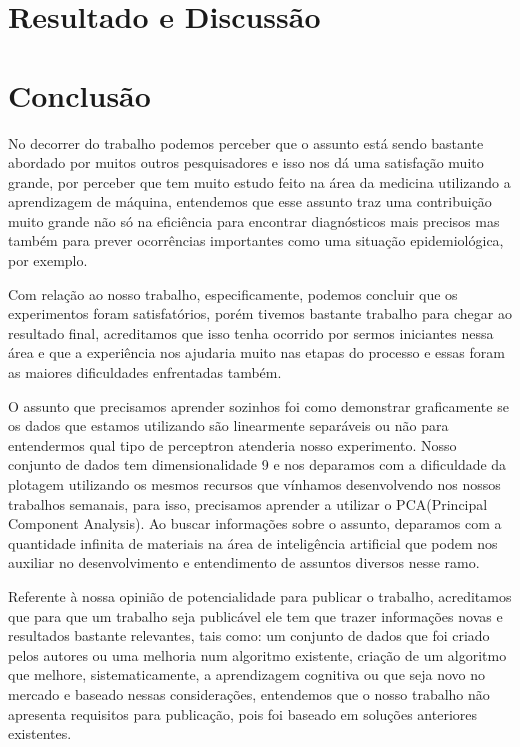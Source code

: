 \documentclass[conference]{IEEEtran}
\begin{document}
	
\section{Resultado e Discussão}

   
    
\section*{Conclusão}

  No decorrer do trabalho podemos perceber que o assunto está sendo bastante abordado por muitos outros pesquisadores e isso nos dá uma satisfação muito grande, por perceber que tem muito estudo feito na área da medicina utilizando a aprendizagem de máquina, entendemos que esse assunto traz uma contribuição muito grande não só na eficiência para encontrar diagnósticos mais precisos mas também para prever ocorrências importantes como uma situação epidemiológica, por exemplo.

    Com relação ao nosso trabalho, especificamente, podemos concluir que os experimentos foram satisfatórios, porém tivemos bastante trabalho para chegar ao resultado final, acreditamos que isso tenha ocorrido por sermos iniciantes nessa área e que a experiência nos ajudaria muito nas etapas do processo e essas foram as maiores dificuldades enfrentadas também.
    
    O assunto que precisamos aprender sozinhos foi como demonstrar graficamente se os dados que estamos utilizando são linearmente separáveis ou não para entendermos qual tipo de perceptron atenderia nosso experimento. Nosso conjunto de dados tem dimensionalidade 9 e nos deparamos com a dificuldade da plotagem utilizando os mesmos recursos que vínhamos desenvolvendo nos nossos trabalhos semanais, para isso, precisamos aprender a utilizar o PCA(Principal Component Analysis). Ao buscar informações sobre o assunto, deparamos com a quantidade infinita de materiais na área de inteligência artificial que podem nos auxiliar no desenvolvimento e entendimento de assuntos diversos nesse ramo.
    
    Referente à nossa opinião de potencialidade para publicar o trabalho, acreditamos que para que um trabalho seja publicável ele tem que trazer informações novas e resultados bastante relevantes, tais como: um conjunto de dados que foi criado pelos autores ou uma melhoria num algoritmo existente, criação de um algoritmo que melhore, sistematicamente, a aprendizagem cognitiva ou que seja novo no mercado e baseado nessas considerações, entendemos que o nosso trabalho não apresenta requisitos para publicação, pois foi baseado em soluções anteriores existentes.
\end{document}
